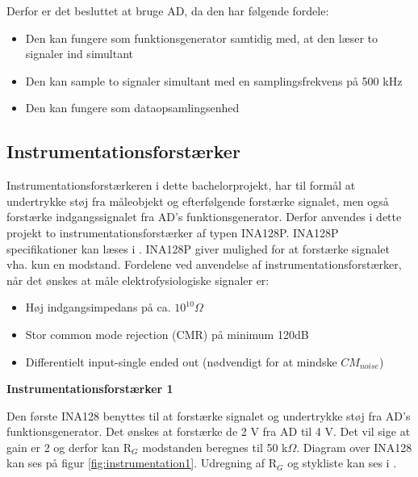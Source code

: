 Derfor er det besluttet at bruge AD, da den har følgende fordele:
\begin{itemize}
\item Den kan fungere som funktionsgenerator samtidig med, at den læser to signaler ind simultant
\item Den kan sample to signaler simultant med en samplingsfrekvens på 500 kHz
\item Den kan fungere som dataopsamlingsenhed
\end{itemize}



\subsection{Instrumentationsforstærker}

Instrumentationsforstærkeren i dette bachelorprojekt, har til formål at undertrykke støj fra måleobjekt og efterfølgende forstærke signalet, men også forstærke indgangssignalet fra AD's funktionsgenerator. Derfor anvendes i dette
projekt to instrumentationsforstærker af typen INA128P. INA128P specifikationer kan læses i . INA128P giver mulighed for at forstærke signalet vha. kun en modstand. Fordelene ved anvendelse af instrumentationsforstærker, når det ønskes at måle elektrofysiologiske signaler er\cite{PeterJohansen2014}:
\begin{itemize}
\item 	Høj indgangsimpedans på ca. $10^{10} \Omega $
\item	Stor common mode rejection (CMR) på minimum 120dB
\item 	Differentielt input-single ended out (nødvendigt for at mindske $CM_{noise}$)
\end{itemize}



\textbf{Instrumentationsforstærker 1}

Den første INA128 benyttes til at forstærke signalet og undertrykke støj fra AD's funktionsgenerator. Det ønskes at forstærke de 2 V fra AD til 4 V. Det vil sige at gain er 2 og derfor kan R$_{G}$ modstanden beregnes til 50 k$\Omega$. Diagram over INA128 kan ses på figur \ref{fig:instrumentation1}. Udregning af R$_{G}$ og stykliste kan ses i .


